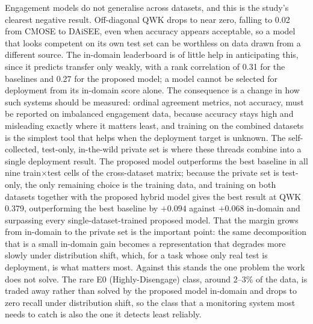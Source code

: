 \documentclass[../main.tex]{subfiles}
\begin{document}
Engagement models do not generalise across datasets, and this is the study's clearest negative result. Off-diagonal QWK drops to near zero, falling to 0.02 from CMOSE to DAiSEE, even when accuracy appears acceptable, so a model that looks competent on its own test set can be worthless on data drawn from a different source. The in-domain leaderboard is of little help in anticipating this, since it predicts transfer only weakly, with a rank correlation of 0.31 for the baselines and 0.27 for the proposed model; a model cannot be selected for deployment from its in-domain score alone. The consequence is a change in how such systems should be measured: ordinal agreement metrics, not accuracy, must be reported on imbalanced engagement data, because accuracy stays high and misleading exactly where it matters least, and training on the combined datasets is the simplest tool that helps when the deployment target is unknown. The self-collected, test-only, in-the-wild private set is where these threads combine into a single deployment result. The proposed model outperforms the best baseline in all nine train$\times$test cells of the cross-dataset matrix; because the private set is test-only, the only remaining choice is the training data, and training on both datasets together with the proposed hybrid model gives the best result at QWK 0.379, outperforming the best baseline by $+0.094$ against $+0.068$ in-domain and surpassing every single-dataset-trained proposed model. That the margin grows from in-domain to the private set is the important point: the same decomposition that is a small in-domain gain becomes a representation that degrades more slowly under distribution shift, which, for a task whose only real test is deployment, is what matters most. Against this stands the one problem the work does not solve. The rare E0 (Highly\nobreakdash-Disengage) class, around 2--3\% of the data, is traded away rather than solved by the proposed model in-domain and drops to zero recall under distribution shift, so the class that a monitoring system most needs to catch is also the one it detects least reliably.
\end{document}
